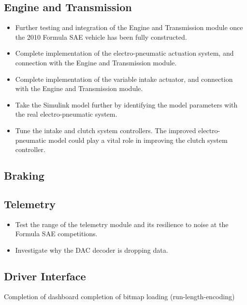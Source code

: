 \subsection{Engine and Transmission}

\begin{itemize}
  \item Further testing and integration of the Engine and Transmission module once the 2010 Formula SAE vehicle has been fully constructed.
  \item Complete implementation of the electro-pneumatic actuation system, and connection with the Engine and Transmission module.
  \item Complete implementation of the variable intake actuator, and connection with the Engine and Transmission module.
  \item Take the Simulink model further by identifying the model parameters with the real electro-pneumatic system.
  \item Tune the intake and clutch system controllers. The improved electro-pneumatic model could play a vital role in improving the clutch system controller.
\end{itemize}

\subsection{Braking}

\subsection{Telemetry}

\begin{itemize}
  \item Test the range of the telemetry module and its resilience to noise at the Formula SAE competitions.
  \item Investigate why the DAC decoder is dropping data.
\end{itemize}

\subsection{Driver Interface}

Completion of dashboard
completion of bitmap loading (run-length-encoding)
